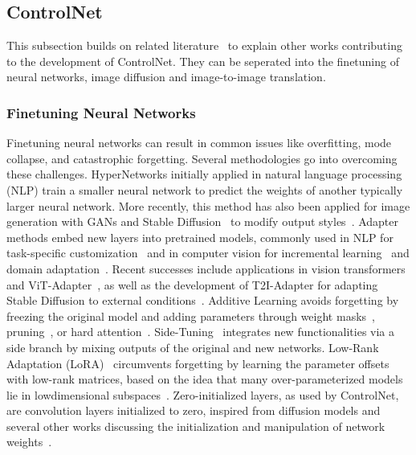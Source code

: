 \subsection{ControlNet}
This subsection builds on related literature~\cite{zhang2023addingconditionalcontroltexttoimage} 
to explain other works contributing to the development of ControlNet. They can be seperated into
the finetuning of neural networks, image diffusion and image-to-image translation.

\subsubsection{Finetuning Neural Networks}
Finetuning neural networks can result in common issues like overfitting, mode collapse, and 
catastrophic forgetting. Several methodologies go into overcoming these challenges. 
HyperNetworks initially applied in natural language processing (NLP) train a smaller neural 
network to predict the weights of another typically larger neural network. More recently, 
this method has also been applied for image generation with GANs and Stable Diffusion~\cite{rombach2022stablediffusion} to modify output styles~\cite{alaluf2022hyperstylestyleganinversionhypernetworks, dinh2022hyperinverterimprovingstyleganinversion}.
Adapter methods embed new layers into pretrained models, commonly used in NLP for 
task-specific customization~\cite{houlsby2019parameterefficienttransferlearningnlp, stickland2019bertpalsprojectedattention}
and in computer vision for incremental learning~\cite{rosenfeld2018incrementallearningdeepadaptation} 
and domain adaptation~\cite{rebuffi2018efficientparametrizationmultidomaindeep}. 
Recent successes include applications in vision transformers~\cite{li2022exploringplainvisiontransformer, li2021benchmarkingdetectiontransferlearning} 
and ViT-Adapter~\cite{chen2023visiontransformeradapterdense}, 
as well as the development of T2I-Adapter for adapting Stable Diffusion to external 
conditions~\cite{mou2023t2iadapterlearningadaptersdig}.
Additive Learning avoids forgetting by freezing the original model and 
adding parameters through weight masks~\cite{mallya2018piggybackadaptingsinglenetwork, rosenfeld2018incrementallearningdeepadaptation}, 
pruning~\cite{mallya2018packnetaddingmultipletasks}, or hard attention~\cite{serrà2018overcomingcatastrophicforgettinghard}. 
Side-Tuning~\cite{zhang2020sidetuningbaselinenetworkadaptation} integrates new functionalities 
via a side branch by mixing outputs of the original and new networks. Low-Rank Adaptation 
(LoRA)~\cite{hu2021loralowrankadaptationlarge} circumvents forgetting by learning the 
parameter offsets with low-rank matrices, based on the idea that many over-parameterized 
models lie in lowdimensional subspaces~\cite{aghajanyan2020intrinsicdimensionalityexplainseffectiveness, li2018measuringintrinsicdimensionobjective}. 
Zero-initialized layers, as used by ControlNet, are convolution layers initialized to zero, inspired 
from diffusion models and several other works discussing the initialization and manipulation
of network weights~\cite{lecun2015deeplearning,rombach2022stablediffusion, karras2018progressivegrowinggansimproved}.

